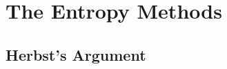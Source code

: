 \documentclass[11pt]{article}
\begin{document}
\section{The Entropy Methods}
\subsection{Herbst's Argument}
\begin{itemize}



\end{itemize}
\end{document}
